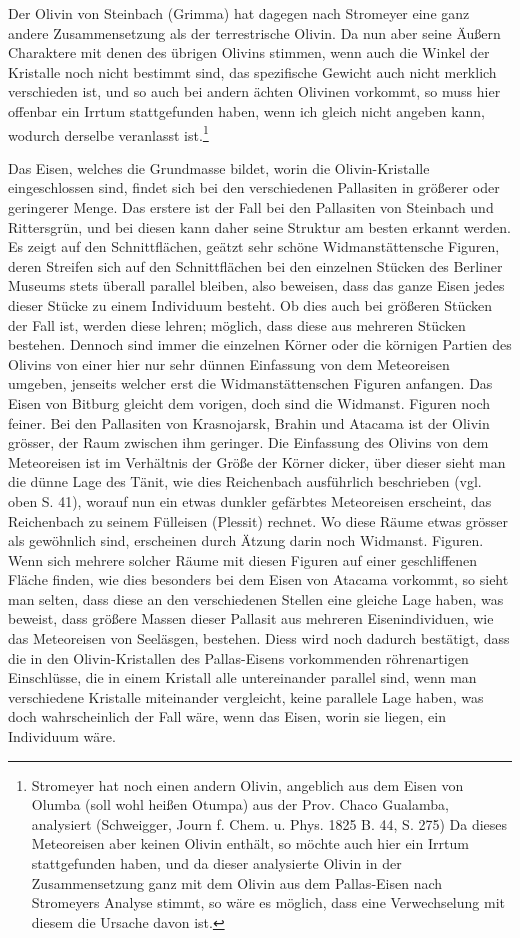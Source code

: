 \documentclass[a4paper, 11pt, oneside]{article}
\begin{document}
Der Olivin von Steinbach (Grimma) hat dagegen nach Stromeyer eine ganz andere Zusammensetzung als der terrestrische Olivin. Da nun aber seine Äußern Charaktere mit denen des übrigen Olivins stimmen, wenn auch die Winkel der Kristalle noch nicht bestimmt sind, das spezifische Gewicht auch nicht merklich verschieden ist, und so auch bei andern ächten Olivinen vorkommt, so muss hier offenbar ein Irrtum stattgefunden haben, wenn ich gleich nicht angeben kann, wodurch derselbe veranlasst ist.\footnote{Stromeyer hat noch einen andern Olivin, angeblich aus dem Eisen von Olumba (soll wohl heißen Otumpa) aus der Prov. Chaco Gualamba, analysiert (Schweigger, Journ f. Chem. u. Phys. 1825 B. 44, S. 275) Da dieses Meteoreisen aber keinen Olivin enthält, so möchte auch hier ein Irrtum stattgefunden haben, und da dieser analysierte Olivin in der Zusammensetzung ganz mit dem Olivin aus dem Pallas-Eisen nach Stromeyers Analyse stimmt, so wäre es möglich, dass eine Verwechselung mit diesem die Ursache davon ist.}

Das Eisen, welches die Grundmasse bildet, worin die Olivin-Kristalle eingeschlossen sind, findet sich bei den verschiedenen Pallasiten in größerer oder geringerer Menge. Das erstere ist der Fall bei den Pallasiten von Steinbach und Rittersgrün, und bei diesen kann daher seine Struktur am besten erkannt werden. Es zeigt auf den Schnittflächen, geätzt sehr schöne Widmanstättensche Figuren, deren Streifen sich auf den Schnittflächen bei den einzelnen Stücken des Berliner Museums stets überall parallel bleiben, also beweisen, dass das ganze Eisen jedes dieser Stücke zu einem Individuum besteht. Ob dies auch bei größeren Stücken der Fall ist, werden diese lehren; möglich, dass diese aus mehreren Stücken bestehen. Dennoch sind immer die einzelnen Körner oder die körnigen Partien des Olivins von einer hier nur sehr dünnen Einfassung von dem Meteoreisen umgeben, jenseits welcher erst die Widmanstättenschen Figuren anfangen. Das Eisen von Bitburg gleicht dem vorigen, doch sind die Widmanst. Figuren noch feiner. Bei den Pallasiten von Krasnojarsk, Brahin und Atacama ist der Olivin grösser, der Raum zwischen ihm geringer. Die Einfassung des Olivins von dem Meteoreisen ist im Verhältnis der Größe der Körner dicker, über dieser sieht man die dünne Lage des Tänit, wie dies Reichenbach ausführlich beschrieben (vgl. oben S. 41), worauf nun ein etwas dunkler gefärbtes Meteoreisen erscheint, das Reichenbach zu seinem Fülleisen (Plessit) rechnet. Wo diese Räume etwas grösser als gewöhnlich sind, erscheinen durch Ätzung darin noch Widmanst. Figuren. Wenn sich mehrere solcher Räume mit diesen Figuren auf einer geschliffenen Fläche finden, wie dies besonders bei dem Eisen von Atacama vorkommt, so sieht man selten, dass diese an den verschiedenen Stellen eine gleiche Lage haben, was beweist, dass größere Massen dieser Pallasit aus mehreren Eisenindividuen, wie das Meteoreisen von Seeläsgen, bestehen. Diess wird noch dadurch bestätigt, dass die in den Olivin-Kristallen des Pallas-Eisens vorkommenden röhrenartigen Einschlüsse, die in einem Kristall alle untereinander parallel sind, wenn man verschiedene Kristalle miteinander vergleicht, keine parallele Lage haben, was doch wahrscheinlich der Fall wäre, wenn das Eisen, worin sie liegen, ein Individuum wäre.
\end{document}
